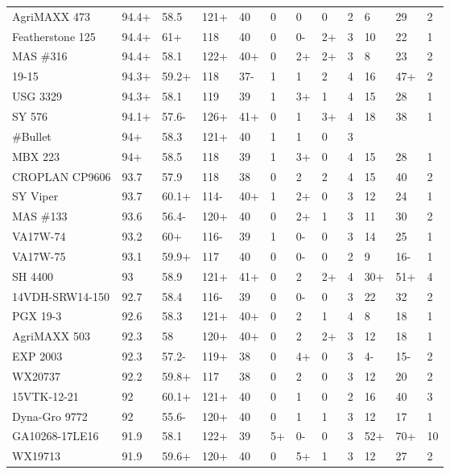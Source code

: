 \documentclass[12pt, letterpaper]{article}
\begin{document}
\begin{landscape}
\begin{ThreePartTable}
\begin{longtable}{llllllllllll}
  AgriMAXX 473 & 94.4+ & 58.5 & 121+ & 40 & 0 & 0 & 0 & 2 & 6 & 29 & 2 \\ 
  Featherstone 125 & 94.4+ & 61+ & 118 & 40 & 0 & 0- & 2+ & 3 & 10 & 22 & 1 \\ 
  MAS \#316 & 94.4+ & 58.1 & 122+ & 40+ & 0 & 2+ & 2+ & 3 & 8 & 23 & 2 \\ 
  19-15 & 94.3+ & 59.2+ & 118 & 37- & 1 & 1 & 2 & 4 & 16 & 47+ & 2 \\ 
  USG 3329 & 94.3+ & 58.1 & 119 & 39 & 1 & 3+ & 1 & 4 & 15 & 28 & 1 \\ 
  SY 576 & 94.1+ & 57.6- & 126+ & 41+ & 0 & 1 & 3+ & 4 & 18 & 38 & 1 \\ 
  \#Bullet & 94+ & 58.3 & 121+ & 40 & 1 & 1 & 0 & 3 &  &  &  \\ 
  MBX 223 & 94+ & 58.5 & 118 & 39 & 1 & 3+ & 0 & 4 & 15 & 28 & 1 \\ 
  CROPLAN CP9606 & 93.7 & 57.9 & 118 & 38 & 0 & 2 & 2 & 4 & 15 & 40 & 2 \\ 
  SY Viper & 93.7 & 60.1+ & 114- & 40+ & 1 & 2+ & 0 & 3 & 12 & 24 & 1 \\ 
  MAS \#133 & 93.6 & 56.4- & 120+ & 40 & 0 & 2+ & 1 & 3 & 11 & 30 & 2 \\ 
  VA17W-74 & 93.2 & 60+ & 116- & 39 & 1 & 0- & 0 & 3 & 14 & 25 & 1 \\ 
  VA17W-75 & 93.1 & 59.9+ & 117 & 40 & 0 & 0- & 0 & 2 & 9 & 16- & 1 \\ 
  SH 4400 & 93 & 58.9 & 121+ & 41+ & 0 & 2 & 2+ & 4 & 30+ & 51+ & 4 \\ 
  14VDH-SRW14-150 & 92.7 & 58.4 & 116- & 39 & 0 & 0- & 0 & 3 & 22 & 32 & 2 \\ 
  PGX 19-3 & 92.6 & 58.3 & 121+ & 40+ & 0 & 2 & 1 & 4 & 8 & 18 & 1 \\ 
  AgriMAXX 503 & 92.3 & 58 & 120+ & 40+ & 0 & 2 & 2+ & 3 & 12 & 18 & 1 \\ 
  EXP 2003 & 92.3 & 57.2- & 119+ & 38 & 0 & 4+ & 0 & 3 & 4- & 15- & 2 \\ 
  WX20737 & 92.2 & 59.8+ & 117 & 38 & 0 & 2 & 0 & 3 & 12 & 20 & 2 \\ 
  15VTK-12-21 & 92 & 60.1+ & 121+ & 40 & 0 & 1 & 0 & 2 & 16 & 40 & 3 \\ 
  Dyna-Gro 9772 & 92 & 55.6- & 120+ & 40 & 0 & 1 & 1 & 3 & 12 & 17 & 1 \\ 
  GA10268-17LE16 & 91.9 & 58.1 & 122+ & 39 & 5+ & 0- & 0 & 3 & 52+ & 70+ & 10 \\ 
  WX19713 & 91.9 & 59.6+ & 120+ & 40 & 0 & 5+ & 1 & 3 & 12 & 27 & 2 \\ 

\end{longtable}
\end{ThreePartTable}
\end{landscape}
\end{document}
